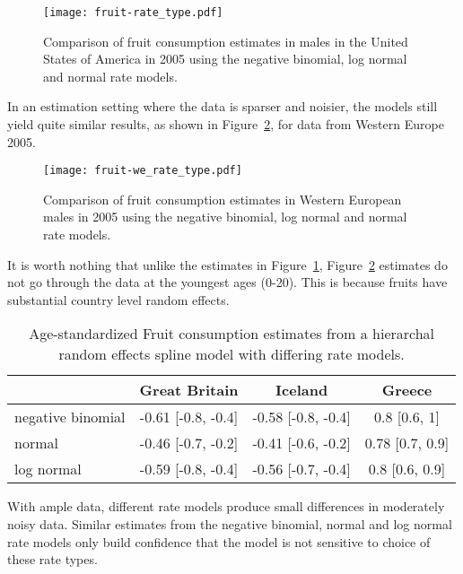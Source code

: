     \begin{figure}[h]
        \begin{center}
            \texttt{[image: fruit-rate\_type.pdf]}
            \caption{Comparison of fruit consumption estimates in
              males in the United States of America in 2005 using the
              negative binomial, log normal and normal rate models.}
            \label{fig:app-fruit rate type}
        \end{center}
    \end{figure}

In an estimation setting where the data is sparser and noisier, the
models still yield quite similar results, as shown in Figure~\ref{fig:app-fruit europe},
for data from Western Europe 2005.

    \begin{figure}[h]
        \begin{center}
            \texttt{[image: fruit-we\_rate\_type.pdf]}
            \caption{Comparison of fruit consumption estimates in
              Western European males in 2005 using the
              negative binomial, log normal and normal rate models.}
            \label{fig:app-fruit europe}
        \end{center}
    \end{figure}

It is worth nothing that unlike the estimates in Figure~\ref{fig:app-fruit rate type}, 
Figure~\ref{fig:app-fruit europe} estimates do not go through the data at the youngest
ages (0-20).  This is because fruits have substantial country level random effects.



    \begin{table}[h]
        \begin{center}
        \begin{tabular}{|p{1.7cm}|c|c|c|}
            \hline
                & Great Britain & Iceland & Greece \\
            \hline
                negative binomial & -0.61 [-0.8, -0.4] & -0.58 [-0.8, -0.4] & 0.8 [0.6, 1] \\
                normal & -0.46 [-0.7, -0.2] & -0.41 [-0.6, -0.2] & 0.78 [0.7, 0.9] \\
                log normal & -0.59 [-0.8, -0.4] & -0.56 [-0.7, -0.4] & 0.8 [0.6, 0.9] \\
            \hline
        \end{tabular}
        \end{center}
        \caption{ Age-standardized Fruit consumption estimates
          from a hierarchal random effects spline model with differing
          rate models.}
        \label{tab:app-fruit rfx}
    \end{table}





With ample data, different rate models produce small differences in moderately noisy data.  Similar estimates from the negative binomial, normal and log normal rate models only build confidence that the model is not sensitive to choice of these rate types.